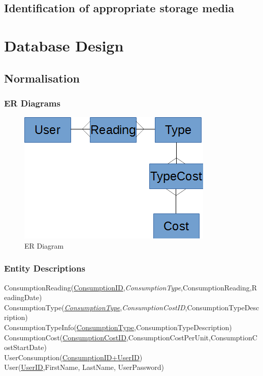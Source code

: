 \subsection{Identification of appropriate storage media}

\section{Database Design}

\subsection{Normalisation}

\subsubsection{ER Diagrams}
\begin{figure}[H]
\includegraphics{./design/ER Diagrams.png}
\caption{ER Diagram}
\end{figure}

\subsubsection{Entity Descriptions}
ConsumptionReading(\underline{ConsumptionID},\emph{ConsumptionType},ConsumptionReading,ReadingDate)\\
ConsumptionType(\underline{\emph{ConsumptionType}},\emph{ConsumptionCostID},ConsumptionTypeDescription)\\
ConsumptionTypeInfo(\underline{ConsumptionType},ConsumptionTypeDescription)\\
ConsumptionCost(\underline{ConsumptionCostID},ConsumptionCostPerUnit,ConsumptionCostStartDate)\\
UserConsumption(\underline{ConsumptionID+UserID})\\
User(\underline{UserID},FirstName, LastName, UserPassword)\\

